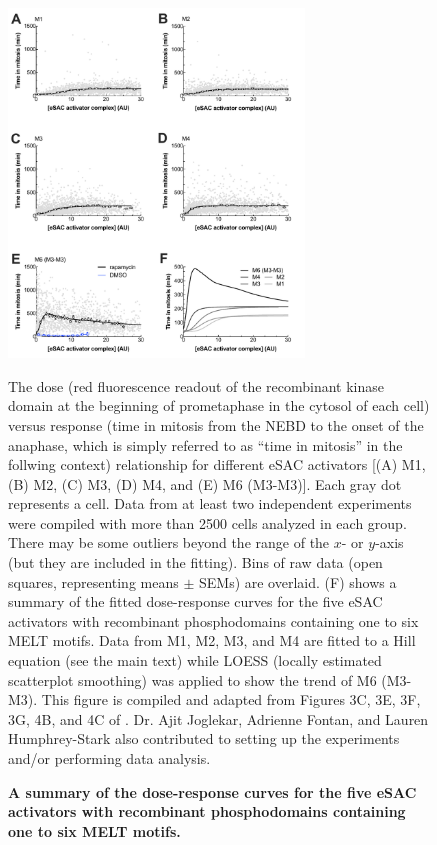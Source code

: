 \begin{figure}
    \centering
    \includegraphics[width=0.7\textwidth]{chapters/figures/DoseResponse.pdf}
    \caption{\textbf{A summary of the dose-response curves for the five eSAC activators with recombinant phosphodomains containing one to six MELT motifs.}}
    \noindent\justifying The dose (red fluorescence readout of the recombinant  kinase domain at the beginning of prometaphase in the cytosol of each cell) versus response (time in mitosis from the NEBD to the onset of the anaphase, which is simply referred to as ``time in mitosis'' in the follwing context) relationship for different eSAC activators [(A) M1, (B) M2, (C) M3, (D) M4, and (E) M6 (M3-M3)]. Each gray dot represents a cell. Data from at least two independent experiments were compiled with more than \SI{2500}{} cells analyzed in each group. There may be some outliers beyond the range of the $x$- or $y$-axis (but they are included in the fitting). Bins of raw data (open squares, representing means $\pm$ SEMs) are overlaid. (F) shows a summary of the fitted dose-response curves for the five eSAC activators with recombinant phosphodomains containing one to six MELT motifs. Data from M1, M2, M3, and M4 are fitted to a Hill equation (see the main text) while LOESS (locally estimated scatterplot smoothing) was applied to show the trend of M6 (M3-M3). This figure is compiled and adapted from Figures 3C, 3E, 3F, 3G, 4B, and 4C of \cite{eSAC}. Dr. Ajit Joglekar, Adrienne Fontan, and Lauren Humphrey-Stark also contributed to setting up the experiments and/or performing data analysis.
    \label{DoseResponse}
\end{figure}

